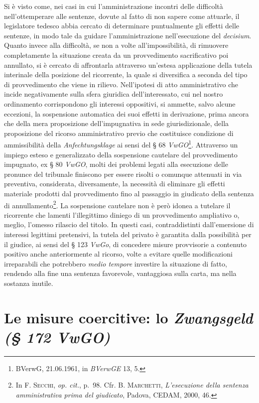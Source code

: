 \documentclass[12pt,it,a4paper,]{report}
\begin{document}
Si è visto come, nei casi in cui l'amministrazione incontri delle
difficoltà nell'ottemperare alle sentenze, dovute al fatto di non sapere
come attuarle, il legislatore tedesco abbia cercato di determinare
puntualmente gli effetti delle sentenze, in modo tale da guidare
l'amministrazione nell'esecuzione del \emph{decisium}. Quanto invece
alla difficoltà, se non a volte all'impossibilità, di rimuovere
completamente la situazione creata da un provvedimento sacrificativo poi
annullato, si è cercato di affrontarla attraverso un'estesa applicazione
della tutela interinale della posizione del ricorrente, la quale si
diversifica a seconda del tipo di provvedimento che viene in rilievo.
Nell'ipotesi di atto amministrativo che incide negativamente sulla sfera
giuridica dell'interessato, cui nel nostro ordinamento corrispondono gli
interessi oppositivi, si ammette, salvo alcune eccezioni, la sospensione
automatica dei suoi effetti in derivazione, prima ancora che della mera
proposizione dell'impugnativa in sede giurisdizionale, della
proposizione del ricorso amministrativo previo che costituisce
condizione di ammissibilità della \emph{Anfechtungsklage} ai sensi del §
68 \emph{VwGO}\footnote{BVerwG, 21.06.1961, in \emph{BVerwGE} 13, 5.}.
Attraverso un impiego esteso e generalizzato della sospensione cautelare
del provvedimento impugnato, ex § 80 \emph{VwGO}, molti dei problemi
legati alla esecuzione delle pronunce del tribunale finiscono per essere
risolti o comunque attenuati in via preventiva, considerata,
diversamente, la necessità di eliminare gli effetti materiale prodotti
dal provvedimento fino al passaggio in giudicato della sentenza di
annullamento\footnote{In \textsc{F. Secchi}, \emph{op. cit.}, p.~98.
  Cfr. B. \textsc{Marchetti}, \emph{L'esecuzione della sentenza
  amministrativa prima del giudicato}, Padova, CEDAM, 2000, 46.}. La
sospensione cautelare non è però idonea a tutelare il ricorrente che
lamenti l'illegittimo diniego di un provvedimento ampliativo o, meglio,
l'omesso rilascio del titolo. In questi casi, contraddistinti
dall'emersione di interessi legittimi pretensivi, la tutela del privato
è garantita dalla possibilità per il giudice, ai sensi del § 123
\emph{VwGo}, di concedere misure provvisorie a contenuto positivo anche
anteriormente al ricorso, volte a evitare quelle modificazioni
irreparabili che potrebbero \emph{medio tempore} investire la situazione
di fatto, rendendo alla fine una sentenza favorevole, vantaggiosa sulla
carta, ma nella sostanza inutile.

\hypertarget{le-misure-coercitive-lo-zwangsgeld-172-vwgo}{%
\section{\texorpdfstring{Le misure coercitive: lo \emph{Zwangsgeld (§
172
VwGO)}}{Le misure coercitive: lo Zwangsgeld (§ 172 VwGO)}}\label{le-misure-coercitive-lo-zwangsgeld-172-vwgo}}
\end{document}
